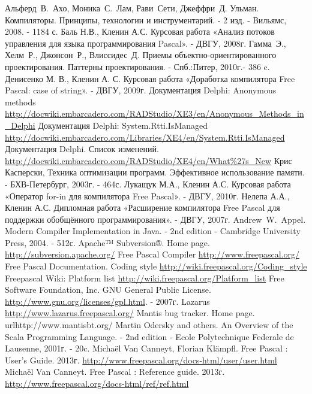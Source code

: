 \documentclass{imcs}
\begin{document}
\begin{thebibliography}{99}
 Альферд~В.~Ахо, Моника~С.~Лам, Рави~Сети, Джеффри~Д. Ульман. Компиляторы. Принципы, технологии и инструментарий. - 2 изд. - Вильямс, 2008. - 1184 с.
 Баль Н.В., Кленин А.С. Курсовая работа «Анализ потоков управления для языка программирования Pascal». - ДВГУ, 2008г.
 Гамма~Э., Хелм~Р., Джонсон~Р., Влиссидес~Д. Приемы объектно-ориентированного проектирования. Паттерны проектирования. - Спб.:Питер, 2010г.- 386 c.
 Денисенко М. В., Кленин А. С. Курсовая работа «Доработка компилятора Free Pascal: case of string». - ДВГУ, 2009г.
 Документация Delphi: Anonymous methods \url{http://docwiki.embarcadero.com/RADStudio/XE3/en/Anonymous_Methods_in_Delphi}
 Документация Delphi: System.Rtti.IsManaged \url{http://docwiki.embarcadero.com/Libraries/XE4/en/System.Rtti.IsManaged}
 Документация Delphi. Список изменений. \url{http://docwiki.embarcadero.com/RADStudio/XE4/en/What\%27s\_New}
 Крис Касперски, Техника оптимизации программ. Эффективное использование памяти. - БХВ-Петербург, 2003г. - 464с.
 Лукащук М.А., Кленин А.С. Курсовая работа «Оператор for-in для компилятора Free Pascal». - ДВГУ, 2010г.
 Нелепа А.А., Кленин А.С. Дипломная работа «Расширение компилятора Free Pascal для поддержки обобщённого программирования». - ДВГУ, 2007г.
 Andrew~W.~Appel. Modern Compiler Implementation in Java. - 2nd edition - Cambridge University Press, 2004. - 512с.
 Apache™ Subversion®. Home page. \url{http://subversion.apache.org/}
 Free Pascal Compiler \url{http://www.freepascal.org/}
 Free Pascal Documentation. Coding style \url{http://wiki.freepascal.org/Coding_style}
 Freepascal Wiki: Platform list \url{http://wiki.freepascal.org/Platform_list}
 Free Software Foundation, Inc. GNU General Public License. \url{http://www.gnu.org/licenses/gpl.html}. - 2007г.
 Lazarus \url{http://www.lazarus.freepascal.org/}
 Mantis bug tracker. Home page. url{http://www.mantisbt.org/}
 Martin Odersky and others. An Overview of the Scala Programming Language. - 2nd edition - Ecole Polytechnique Federale de Lausenne, 2001г. - 20c.
 Michaël Van Canneyt, Florian Klämpfl. Free Pascal : User’s Guide. 2013г. \url{http://www.freepascal.org/docs-html/user/user.html}
 Michaël Van Canneyt. Free Pascal : Reference guide. 2013г. \url{http://www.freepascal.org/docs-html/ref/ref.html}

\end{thebibliography}
\end{document}
